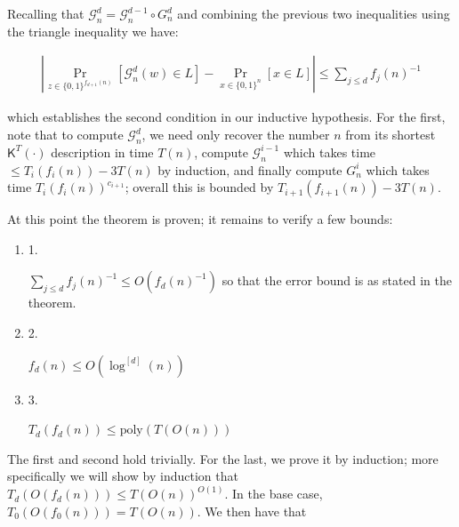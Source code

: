 \documentclass[10pt,a4paper]{article}
\begin{document}
Recalling that $\mathcal{G}^{d}_{n}=\mathcal{G}^{d-1}_{n}\circ G^{d}_{n}$ and combining the previous two inequalities using the triangle inequality we have:\par


\[\begin{gathered}
|\Pr_{z\in\{0,1\}^{f_{d+1}(n)}}[\mathcal{G}^{d}_{n}(w)\in L]-\Pr_{x\in\{0,1\}^{n}}[x\in L]|\leq\sum_{j\leq d}f_{j}(n)^{-1}
\end{gathered}\]


which establishes the second condition in our inductive hypothesis. For the first, note that to compute $\mathcal{G}^{d}_{n}$, we need only recover the number $n$ from its shortest ${\mathsf{K}}^{T}(\cdot)$ description in time $T(n)$, compute $\mathcal{G}^{i-1}_{n}$ which takes time $\leq T_{i}(f_{i}(n))-3T(n)$ by induction, and finally compute $G^{i}_{n}$ which takes time $T_{i}(f_{i}(n))^{c_{i+1}}$; overall this is bounded by $T_{i+1}(f_{i+1}(n))-3T(n)$.\par




At this point the theorem is proven; it remains to verify a few bounds:\par


\begin{enumerate}


\item[] 
1. 


$\sum_{j\leq d}f_{j}(n)^{-1}\leq O(f_{d}(n)^{-1})$ so that the error bound is as stated in the theorem.\par





\item[] 
2. 


$f_{d}(n)\leq O(\log^{[d]}(n))$\par





\item[] 
3. 


$T_{d}(f_{d}(n))\leq\mathrm{poly}(T(O(n)))$\par





\end{enumerate}


The first and second hold trivially. For the last, we prove it by induction; more specifically we will show by induction that $T_{d}(O(f_{d}(n)))\leq T(O(n))^{O(1)}$. In the base case, $T_{0}(O(f_{0}(n)))=T(O(n))$. We then have that\par
\end{document}
